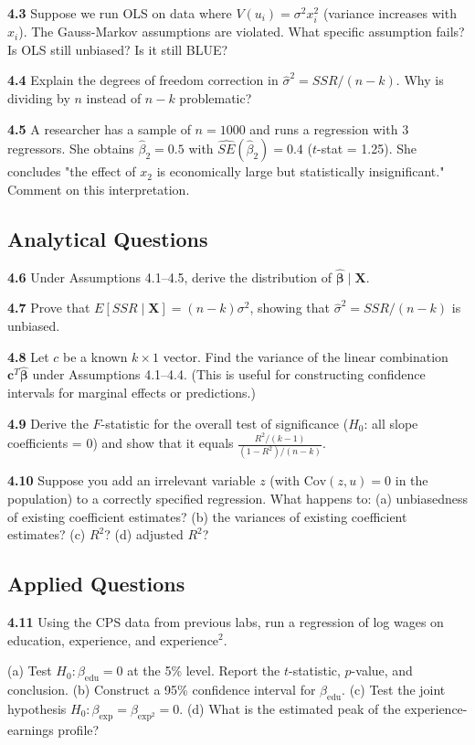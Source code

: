 \textbf{4.3} Suppose we run OLS on data where $V(u_i) = \sigma^2 x_i^2$ (variance increases with $x_i$). The Gauss-Markov assumptions are violated. What specific assumption fails? Is OLS still unbiased? Is it still BLUE?

\textbf{4.4} Explain the degrees of freedom correction in $\hat{\sigma}^2 = SSR/(n-k)$. Why is dividing by $n$ instead of $n - k$ problematic?

\textbf{4.5} A researcher has a sample of $n = 1000$ and runs a regression with 3 regressors. She obtains $\hat{\beta}_2 = 0.5$ with $\widehat{SE}(\hat{\beta}_2) = 0.4$ ($t$-stat = 1.25). She concludes "the effect of $x_2$ is economically large but statistically insignificant." Comment on this interpretation.

\subsection{Analytical Questions}

\textbf{4.6} Under Assumptions 4.1--4.5, derive the distribution of $\hat{\boldsymbol{\beta}} \mid \mathbf{X}$.

\textbf{4.7} Prove that $E[SSR \mid \mathbf{X}] = (n-k)\sigma^2$, showing that $\hat{\sigma}^2 = SSR/(n-k)$ is unbiased.

\textbf{4.8} Let $c$ be a known $k \times 1$ vector. Find the variance of the linear combination $\mathbf{c}^T \hat{\boldsymbol{\beta}}$ under Assumptions 4.1--4.4. (This is useful for constructing confidence intervals for marginal effects or predictions.)

\textbf{4.9} Derive the $F$-statistic for the overall test of significance ($H_0$: all slope coefficients = 0) and show that it equals $\frac{R^2/(k-1)}{(1-R^2)/(n-k)}$.

\textbf{4.10} Suppose you add an irrelevant variable $z$ (with $\text{Cov}(z, u) = 0$ in the population) to a correctly specified regression. What happens to: (a) unbiasedness of existing coefficient estimates? (b) the variances of existing coefficient estimates? (c) $R^2$? (d) adjusted $R^2$?

\subsection{Applied Questions}

\textbf{4.11} Using the CPS data from previous labs, run a regression of log wages on education, experience, and experience$^2$. 

(a) Test $H_0: \beta_{\text{edu}} = 0$ at the 5\% level. Report the $t$-statistic, $p$-value, and conclusion.  
(b) Construct a 95\% confidence interval for $\beta_{\text{edu}}$.  
(c) Test the joint hypothesis $H_0: \beta_{\text{exp}} = \beta_{\text{exp}^2} = 0$.  
(d) What is the estimated peak of the experience-earnings profile?

